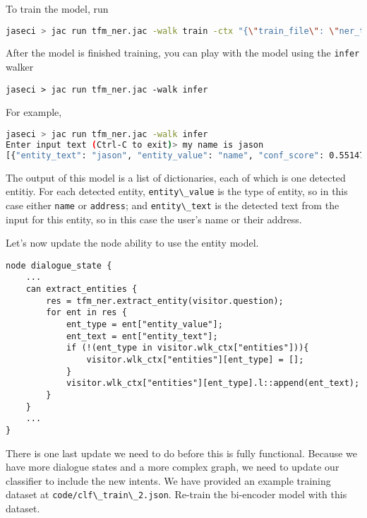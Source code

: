 To train the model, run

\begin{lstlisting}[language=bash]
jaseci > jac run tfm_ner.jac -walk train -ctx "{\"train_file\": \"ner_train.json\"}"
\end{lstlisting}

After the model is finished training, you can play with the model using
the \passthrough{\lstinline!infer!} walker

\begin{lstlisting}
jaseci > jac run tfm_ner.jac -walk infer
\end{lstlisting}

For example,

\begin{lstlisting}[language=bash]
jaseci > jac run tfm_ner.jac -walk infer
Enter input text (Ctrl-C to exit)> my name is jason
[{"entity_text": "jason", "entity_value": "name", "conf_score": 0.5514775514602661, "start_pos": 11, "end_pos": 16}]
\end{lstlisting}

The output of this model is a list of dictionaries, each of which is one
detected entitiy. For each detected entity,
\passthrough{\lstinline!entity\_value!} is the type of entity, so in
this case either \passthrough{\lstinline!name!} or
\passthrough{\lstinline!address!}; and
\passthrough{\lstinline!entity\_text!} is the detected text from the
input for this entity, so in this case the user's name or their address.

Let's now update the node ability to use the entity model.

\begin{lstlisting}
node dialogue_state {
    ...
    can extract_entities {
        res = tfm_ner.extract_entity(visitor.question);
        for ent in res {
            ent_type = ent["entity_value"];
            ent_text = ent["entity_text"];
            if (!(ent_type in visitor.wlk_ctx["entities"])){
                visitor.wlk_ctx["entities"][ent_type] = [];
            }
            visitor.wlk_ctx["entities"][ent_type].l::append(ent_text);
        }
    }
    ...
}
\end{lstlisting}

There is one last update we need to do before this is fully functional.
Because we have more dialogue states and a more complex graph, we need
to update our classifier to include the new intents. We have provided an
example training dataset at
\passthrough{\lstinline!code/clf\_train\_2.json!}. Re-train the
bi-encoder model with this dataset.

